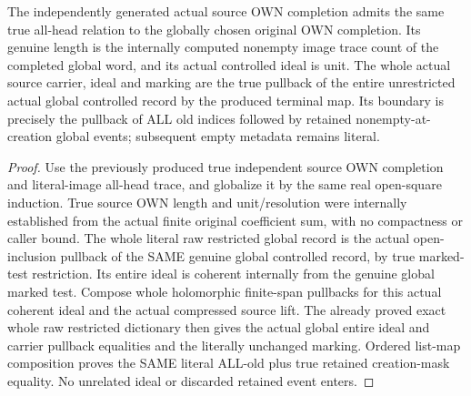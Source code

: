 \begin{theorem}
\label{hir:submersion-global-trace-independent-own}
\leanok
{}

The independently generated actual source OWN completion admits the same true all-head relation to the globally chosen original OWN completion. Its genuine length is the internally computed nonempty image trace count of the completed global word, and its actual controlled ideal is unit. The whole actual source carrier, ideal and marking are the true pullback of the entire unrestricted actual global controlled record by the produced terminal map. Its boundary is precisely the pullback of ALL old indices followed by retained nonempty-at-creation global events; subsequent empty metadata remains literal.
\end{theorem}
\begin{proof}
Use the previously produced true independent source OWN completion and literal-image all-head trace, and globalize it by the same real open-square induction. True source OWN length and unit/resolution were internally established from the actual finite original coefficient sum, with no compactness or caller bound. The whole literal raw restricted global record is the actual open-inclusion pullback of the SAME genuine global controlled record, by true marked-test restriction. Its entire ideal is coherent internally from the genuine global marked test. Compose whole holomorphic finite-span pullbacks for this actual coherent ideal and the actual compressed source lift. The already proved exact whole raw restricted dictionary then gives the actual global entire ideal and carrier pullback equalities and the literally unchanged marking. Ordered list-map composition proves the SAME literal ALL-old plus true retained creation-mask equality. No unrelated ideal or discarded retained event enters.
\end{proof}

